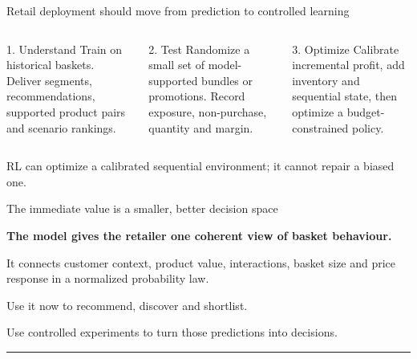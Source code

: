 \documentclass[aspectratio=169,11pt,t]{beamer}
\newcommand{\blue}[1]{\textcolor{Accent}{#1}}
\begin{document}
\begin{frame}{Retail deployment should move from prediction to controlled learning}
\begin{columns}[T,onlytextwidth]
  \begin{block}{1. Understand}
  Train on historical baskets. Deliver segments, recommendations, supported product pairs
  and scenario rankings.
  \end{block}

  \begin{block}{2. Test}
  Randomize a small set of model-supported bundles or promotions. Record exposure,
  non-purchase, quantity and margin.
  \end{block}

  \begin{block}{3. Optimize}
  Calibrate incremental profit, add inventory and sequential state, then optimize a
  budget-constrained policy.
  \end{block}
\end{columns}

\vspace{0.08cm}
\begin{center}
\small\blue{RL can optimize a calibrated sequential environment; it cannot repair a biased one.}
\end{center}
\end{frame}

\begin{frame}{The immediate value is a smaller, better decision space}
\vspace{0.35cm}
\begin{center}
\begin{minipage}{0.86\textwidth}
{\Large\bfseries The model gives the retailer one coherent view of basket behaviour.}\par
\vspace{0.5cm}
{\large It connects customer context, product value, interactions, basket size and price
response in a normalized probability law.}\par
\vspace{0.6cm}
{\large\color{Accent}Use it now to recommend, discover and shortlist.\par}
\vspace{0.22cm}
{\large\color{Accent}Use controlled experiments to turn those predictions into decisions.\par}
\end{minipage}
\end{center}
\vfill
{\color{Rule}\rule{\textwidth}{0.8pt}}
\end{frame}
\end{document}
